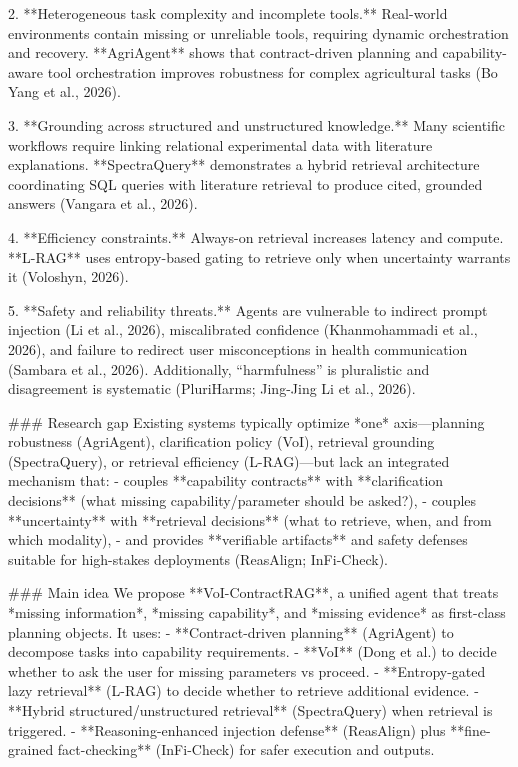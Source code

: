 2. **Heterogeneous task complexity and incomplete tools.** Real-world environments contain missing or unreliable tools, requiring dynamic orchestration and recovery. **AgriAgent** shows that contract-driven planning and capability-aware tool orchestration improves robustness for complex agricultural tasks (Bo Yang et al., 2026).

3. **Grounding across structured and unstructured knowledge.** Many scientific workflows require linking relational experimental data with literature explanations. **SpectraQuery** demonstrates a hybrid retrieval architecture coordinating SQL queries with literature retrieval to produce cited, grounded answers (Vangara et al., 2026).

4. **Efficiency constraints.** Always-on retrieval increases latency and compute. **L-RAG** uses entropy-based gating to retrieve only when uncertainty warrants it (Voloshyn, 2026).

5. **Safety and reliability threats.** Agents are vulnerable to indirect prompt injection (Li et al., 2026), miscalibrated confidence (Khanmohammadi et al., 2026), and failure to redirect user misconceptions in health communication (Sambara et al., 2026). Additionally, “harmfulness” is pluralistic and disagreement is systematic (PluriHarms; Jing-Jing Li et al., 2026).

### Research gap
Existing systems typically optimize *one* axis—planning robustness (AgriAgent), clarification policy (VoI), retrieval grounding (SpectraQuery), or retrieval efficiency (L-RAG)—but lack an integrated mechanism that:
- couples **capability contracts** with **clarification decisions** (what missing capability/parameter should be asked?),
- couples **uncertainty** with **retrieval decisions** (what to retrieve, when, and from which modality),
- and provides **verifiable artifacts** and safety defenses suitable for high-stakes deployments (ReasAlign; InFi-Check).

### Main idea
We propose **VoI-ContractRAG**, a unified agent that treats *missing information*, *missing capability*, and *missing evidence* as first-class planning objects. It uses:
- **Contract-driven planning** (AgriAgent) to decompose tasks into capability requirements.
- **VoI** (Dong et al.) to decide whether to ask the user for missing parameters vs proceed.
- **Entropy-gated lazy retrieval** (L-RAG) to decide whether to retrieve additional evidence.
- **Hybrid structured/unstructured retrieval** (SpectraQuery) when retrieval is triggered.
- **Reasoning-enhanced injection defense** (ReasAlign) plus **fine-grained fact-checking** (InFi-Check) for safer execution and outputs.

